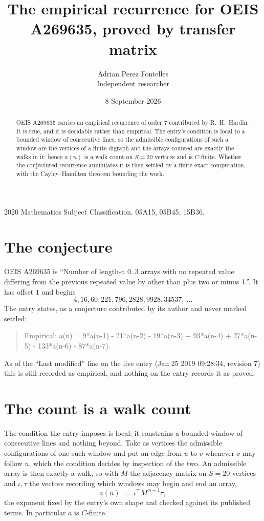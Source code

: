 \documentclass[11pt,a4paper]{article}
\title{The empirical recurrence for OEIS A269635, proved by transfer matrix}
\author{Adrian Perez Fontelles\\ \small Independent researcher}
\date{8 September 2026}
\theoremstyle{plain}
\theoremstyle{definition}
\begin{document}
\maketitle

\begin{abstract}
OEIS A269635 carries an empirical recurrence of order $7$ contributed by R.~H.~Hardin. It is
true, and it is decidable rather than empirical. The entry's condition is local to a bounded window of consecutive lines, so
the admissible configurations of such a window are the vertices of a finite digraph and the
arrays counted are exactly the walks in it; hence $a(n)$ is a walk count on $S=20$ vertices
and is $C$-finite. Whether the conjectured recurrence annihilates it is then settled by a
finite exact computation, with the Cayley--Hamilton theorem bounding the work.
\end{abstract}

\noindent\small 2020 Mathematics Subject Classification. 05A15, 05B45, 15B36.\normalsize

\section{The conjecture}

OEIS A269635 is ``Number of length-n 0..3 arrays with no repeated value differing from the previous repeated value by other than plus two or minus 1.''. It has offset $1$ and begins
\[
4, 16, 60, 221, 796, 2828, 9928, 34537,\ \dots
\]
The entry states, as a conjecture contributed by its author and never marked settled:
\begin{quote}
Empirical: a(n) = 9*a(n-1) - 21*a(n-2) - 19*a(n-3) + 93*a(n-4) + 27*a(n-5) - 133*a(n-6) - 87*a(n-7).
\end{quote}
As of the ``Last modified'' line on the live entry (Jan 25 2019 09:28:34, revision 7) this is still
recorded as empirical, and nothing on the entry records it as proved.

\section{The count is a walk count}

The condition the entry imposes is local: it constrains a bounded window of consecutive lines and nothing beyond. Take as
vertices the admissible configurations of one such window and put an edge from $u$ to $v$
whenever $v$ may follow $u$, which the condition decides by inspection of the two. An
admissible array is then exactly a walk, so with $M$ the adjacency matrix on $S=20$ vertices
and $\iota,\tau$ the vectors recording which windows may begin and end an array,
\[
a(n)\;=\;\iota^{\!\top}M^{\,n-1}\tau ,
\]
the exponent fixed by the entry's own shape and checked against its published terms. In
particular $a$ is $C$-finite.
\end{document}
